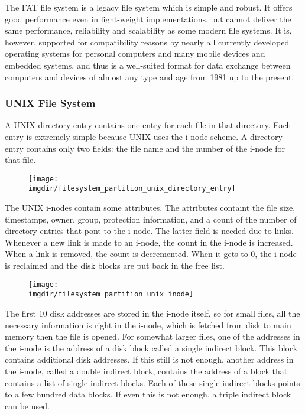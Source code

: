 \documentclass[a4paper, twoside]{article}
\newcommand{\imgdir}{../resources/images} %
\begin{document}
The FAT file system is a legacy file system which is simple and robust. It offers good performance even in light-weight implementations, but cannot deliver the same performance, reliability and scalability as some modern file systems. It is, however, supported for compatibility reasons by nearly all currently developed operating systems for personal computers and many mobile devices and embedded systems, and thus is a well-suited format for data exchange between computers and devices of almost any type and age from 1981 up to the present.

\subsubsection{UNIX File System}
A UNIX directory entry contains one entry for each file in that directory. Each entry is extremely simple because UNIX uses the i-node scheme. A directory entry contains only two fields: the file name and the number of the i-node for that file. 

\begin{figure}[h]
	\centering
	\texttt{[image: \\imgdir/filesystem\_partition\_unix\_directory\_entry]}
	\label{fig:filesystem_partition_unix_directory_entry}
\end{figure}

The UNIX i-nodes contain some attributes. The attributes containt the file size, timestamps, owner, group, protection information, and a count of the number of directory entries that pont to the i-node. The latter field is needed due to links. Whenever a new link is made to an i-node, the count in the i-node is increased. When a link is removed, the count is decremented. When it gets to 0, the i-node is reclaimed and the disk blocks are put back in the free list.

\begin{figure}[h]
	\centering
	\texttt{[image: \\imgdir/filesystem\_partition\_unix\_inode]}
	\label{fig:filesystem_partition_unix_inode}
\end{figure}

The first 10 disk addresses are stored in the i-node itself, so for small files, all the necessary information is right in the i-node, which is fetched from disk to main memory then the file is opened. For somewhat larger files, one of the addresses in the i-node is the address of a disk block called a single indirect block. This block contains additional disk addresses. If this still is not enough, another address in the i-node, called a double indirect block, contains the address of a block that contains a list of single indirect blocks. Each of these single indirect blocks points to a few hundred data blocks. If even this is not enough, a triple indirect block can be used.
\end{document}
